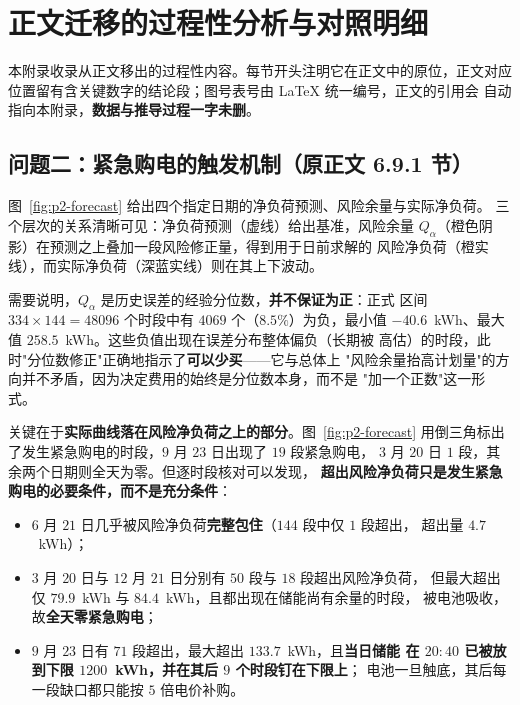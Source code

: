 %

\section{正文迁移的过程性分析与对照明细}
\label{app:moved}

本附录收录从正文移出的过程性内容。每节开头注明它在正文中的原位，正文对应
位置留有含关键数字的结论段；图号表号由 \LaTeX{} 统一编号，正文的引用会
自动指向本附录，\textbf{数据与推导过程一字未删}。

\subsection{问题二：紧急购电的触发机制（原正文 6.9.1 节）}

图~\ref{fig:p2-forecast} 给出四个指定日期的净负荷预测、风险余量与实际净负荷。
三个层次的关系清晰可见：净负荷预测（虚线）给出基准，风险余量
$Q_{\alpha}$（橙色阴影）在预测之上叠加一段风险修正量，得到用于日前求解的
风险净负荷（橙实线），而实际净负荷（深蓝实线）则在其上下波动。

需要说明，$Q_{\alpha}$ 是历史误差的经验分位数，\textbf{并不保证为正}：正式
区间 $334\times144=48096$ 个时段中有 $4069$ 个（$8.5\%$）为负，最小值
$-40.6$~kWh、最大值 $258.5$~kWh。这些负值出现在误差分布整体偏负（长期被
高估）的时段，此时"分位数修正"正确地指示了\textbf{可以少买}——它与总体上
"风险余量抬高计划量"的方向并不矛盾，因为决定费用的始终是分位数本身，而不是
"加一个正数"这一形式。

关键在于\textbf{实际曲线落在风险净负荷之上的部分}。图~\ref{fig:p2-forecast}
用倒三角标出了发生紧急购电的时段，$9$ 月 $23$ 日出现了 $19$ 段紧急购电，
$3$ 月 $20$ 日 $1$ 段，其余两个日期则全天为零。但逐时段核对可以发现，
\textbf{超出风险净负荷只是发生紧急购电的必要条件，而不是充分条件}：

\begin{itemize}
  \item $6$ 月 $21$ 日几乎被风险净负荷\textbf{完整包住}（$144$ 段中仅 $1$ 段超出，
        超出量 $4.7$~kWh）；
  \item $3$ 月 $20$ 日与 $12$ 月 $21$ 日分别有 $50$ 段与 $18$ 段超出风险净负荷，
        但最大超出仅 $79.9$~kWh 与 $84.4$~kWh，且都出现在储能尚有余量的时段，
        被电池吸收，故\textbf{全天零紧急购电}；
  \item $9$ 月 $23$ 日有 $71$ 段超出，最大超出 $133.7$~kWh，且\textbf{当日储能
        在 $20{:}40$ 已被放到下限 $1200$~kWh，并在其后 $9$ 个时段钉在下限上}；
        电池一旦触底，其后每一段缺口都只能按 $5$ 倍电价补购。
\end{itemize}

